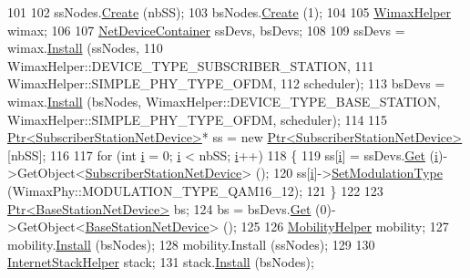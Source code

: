 \begin{DoxyCode}
101 
102   ssNodes.\hyperlink{classns3_1_1NodeContainer_a787f059e2813e8b951cc6914d11dfe69}{Create} (nbSS);
103   bsNodes.\hyperlink{classns3_1_1NodeContainer_a787f059e2813e8b951cc6914d11dfe69}{Create} (1);
104 
105   \hyperlink{classns3_1_1WimaxHelper}{WimaxHelper} wimax;
106 
107   \hyperlink{classns3_1_1NetDeviceContainer}{NetDeviceContainer} ssDevs, bsDevs;
108 
109   ssDevs = wimax.\hyperlink{classns3_1_1WimaxHelper_a9f0848e09c4b6db9cdde9872b38f6349}{Install} (ssNodes,
110                           WimaxHelper::DEVICE\_TYPE\_SUBSCRIBER\_STATION,
111                           WimaxHelper::SIMPLE\_PHY\_TYPE\_OFDM,
112                           scheduler);
113   bsDevs = wimax.\hyperlink{classns3_1_1WimaxHelper_a9f0848e09c4b6db9cdde9872b38f6349}{Install} (bsNodes, WimaxHelper::DEVICE\_TYPE\_BASE\_STATION, 
      WimaxHelper::SIMPLE\_PHY\_TYPE\_OFDM, scheduler);
114 
115   \hyperlink{classns3_1_1Ptr}{Ptr<SubscriberStationNetDevice>}* ss = \textcolor{keyword}{new} 
      \hyperlink{classns3_1_1Ptr}{Ptr<SubscriberStationNetDevice>}[nbSS];
116 
117   \textcolor{keywordflow}{for} (\textcolor{keywordtype}{int} \hyperlink{bernuolliDistribution_8m_a6f6ccfcf58b31cb6412107d9d5281426}{i} = 0; \hyperlink{bernuolliDistribution_8m_a6f6ccfcf58b31cb6412107d9d5281426}{i} < nbSS; \hyperlink{bernuolliDistribution_8m_a6f6ccfcf58b31cb6412107d9d5281426}{i}++)
118     \{
119       ss[\hyperlink{bernuolliDistribution_8m_a6f6ccfcf58b31cb6412107d9d5281426}{i}] = ssDevs.\hyperlink{classns3_1_1NetDeviceContainer_a677d62594b5c9d2dea155cc5045f4d0b}{Get} (\hyperlink{bernuolliDistribution_8m_a6f6ccfcf58b31cb6412107d9d5281426}{i})->GetObject<\hyperlink{classns3_1_1SubscriberStationNetDevice}{SubscriberStationNetDevice}> ();
120       ss[\hyperlink{bernuolliDistribution_8m_a6f6ccfcf58b31cb6412107d9d5281426}{i}]->\hyperlink{classns3_1_1SubscriberStationNetDevice_af6d2d096d7cac7ab7c9a08d0133c64e1}{SetModulationType} (WimaxPhy::MODULATION\_TYPE\_QAM16\_12);
121     \}
122 
123   \hyperlink{classns3_1_1Ptr}{Ptr<BaseStationNetDevice>} bs;
124   bs = bsDevs.\hyperlink{classns3_1_1NetDeviceContainer_a677d62594b5c9d2dea155cc5045f4d0b}{Get} (0)->GetObject<\hyperlink{classns3_1_1BaseStationNetDevice}{BaseStationNetDevice}> ();
125 
126   \hyperlink{classns3_1_1MobilityHelper}{MobilityHelper} mobility;
127   mobility.\hyperlink{classns3_1_1MobilityHelper_a07737960ee95c0777109cf2994dd97ae}{Install} (bsNodes);
128   mobility.Install (ssNodes);
129 
130   \hyperlink{classns3_1_1InternetStackHelper}{InternetStackHelper} stack;
131   stack.\hyperlink{classns3_1_1InternetStackHelper_a6645b412f31283d2d9bc3d8a95cebbc0}{Install} (bsNodes);

\end{DoxyCode}
